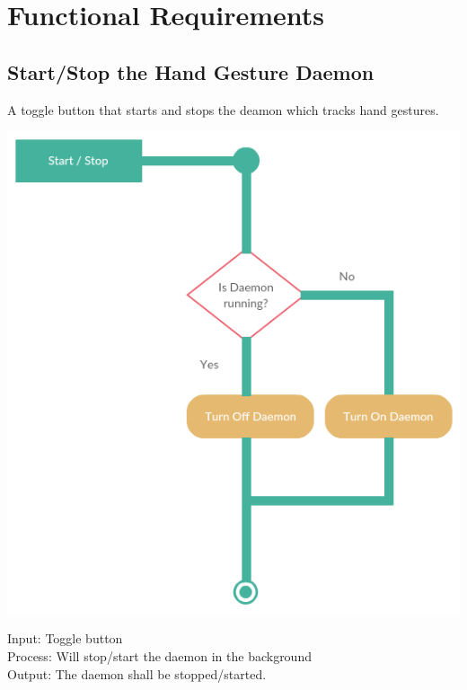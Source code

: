 \documentclass[11pt]{report}
\begin{document}
\section{Functional Requirements}
\subsection{Start/Stop the Hand Gesture Daemon}
A toggle button that starts and stops the deamon which tracks hand gestures.
\begin{center}
    \includegraphics[scale=0.5]{start.png}
\end{center}
Input: Toggle button
\\Process: Will stop/start the daemon in the background
\\Output: The daemon shall be stopped/started.
\end{document}
